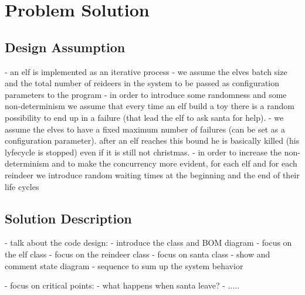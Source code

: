 \section{Problem Solution}
\label{chap:solution}

\subsection{Design Assumption}

- an elf is implemented as an iterative process 
- we assume the elves batch size and the total number of reideers in the system to be passed as configuration parameters to the program
- in order to introduce some randomness and some non-determinism we assume that every time an elf build a toy there is a random possibility to end up in a failure (that lead the elf to ask santa for help).
- we assume the elves to have a fixed maximum number of failures (can be set as a configuration parameter). after an elf reaches this bound he is basically killed (his lyfecycle is stopped) even if it is still not christmas.
- in order to increase the non-determinism and to make the concurrency more evident, for each elf and for each reindeer we introduce random waiting times at the beginning and the end of their life cycles


\subsection{Solution Description}

- talk about the code design: 
- introduce the class and BOM diagram
- focus on the elf class
- focus on the reindeer class
- focus on santa class
- show and comment state diagram
- sequence to sum up the system behavior

- focus on critical points:
- what happens when santa leave?
- .....
